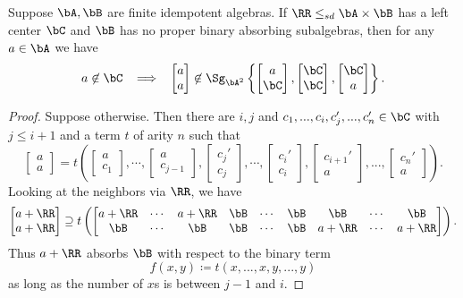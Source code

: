 \begin{thm} Suppose $\bA, \bB$ are finite idempotent algebras. If $\RR \le_{sd} \bA \times \bB$ has a left center $\bC$ and $\bB$ has no proper binary absorbing subalgebras, then for any $a \in \bA$ we have
\[
a \not\in \bC \;\; \implies \;\; \begin{bmatrix}a\\ a\end{bmatrix} \not\in \Sg_{\bA^2}\left\{\begin{bmatrix}a\\ \bC\end{bmatrix}, \begin{bmatrix}\bC\\ \bC\end{bmatrix}, \begin{bmatrix}\bC\\ a\end{bmatrix}\right\}.
\]
\end{thm}
\begin{proof} Suppose otherwise. Then there are $i,j$ and $c_1, ..., c_i, c_j', ..., c_n' \in \bC$ with $j \le i+1$ and a term $t$ of arity $n$ such that
\[
\begin{bmatrix}a\\ a\end{bmatrix} = t\left(\begin{bmatrix}a\\ c_1\end{bmatrix}, \cdots, \begin{bmatrix}a\\ c_{j-1}\end{bmatrix}, \begin{bmatrix}c_j'\\ c_j\end{bmatrix}, \cdots, \begin{bmatrix}c_i'\\ c_i\end{bmatrix}, \begin{bmatrix}c_{i+1}'\\ a\end{bmatrix}, ..., \begin{bmatrix}c_n'\\ a\end{bmatrix}\right).
\]
Looking at the neighbors via $\RR$, we have
\[
\begin{bmatrix}a+\RR\\ a+\RR\end{bmatrix} \supseteq t\left(\begin{bmatrix} a+\RR & \cdots & a+\RR & \bB & \cdots & \bB & \bB & \cdots & \bB\\ \bB & \cdots & \bB & \bB & \cdots & \bB & a+\RR & \cdots & a+\RR \end{bmatrix}\right).
\]
Thus $a+\RR$ absorbs $\bB$ with respect to the binary term
\[
f(x,y) \coloneqq t(x,...,x,y,...,y)
\]
as long as the number of $x$s is between $j-1$ and $i$.
\end{proof}

